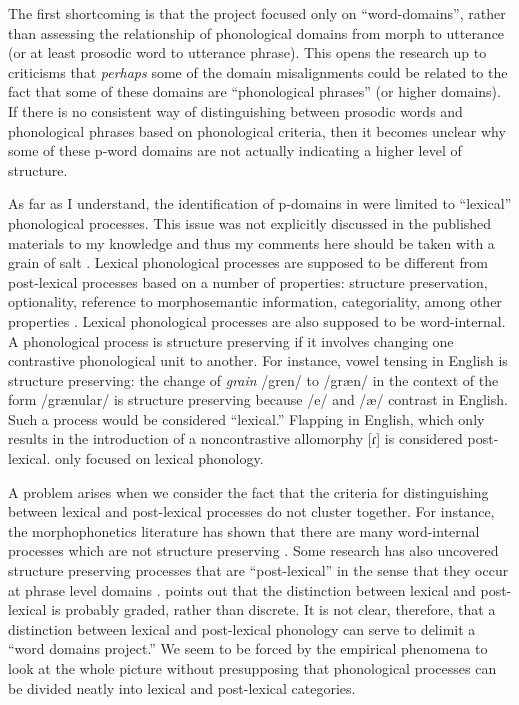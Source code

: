 \documentclass[output=paper,hidelinks]{langscibook}
\begin{document}
The first shortcoming is that the project focused only on ``word-domains'', rather than assessing the relationship of phonological domains from morph to utterance (or at least prosodic word to utterance phrase). This opens the research up to criticisms that \textit{perhaps} some of the domain misalignments could be related to the fact that some of these domains are ``phonological phrases'' (or higher domains). If there is no consistent way of distinguishing between prosodic words and phonological phrases based on phonological criteria, then it becomes unclear why some of these p-word domains are not actually indicating a higher level of structure.

As far as I understand, the identification of p-domains in \citet{schiering2012stress, bickel2009distribution} were limited to ``lexical'' phonological processes. This issue was not explicitly discussed in the published materials to my knowledge and thus my comments here should be taken with a grain of salt . Lexical phonological processes are supposed to be different from post-lexical processes based on a number of properties: structure preservation, optionality, reference to morphosemantic information, categoriality, among other properties \citep[201]{zsiga2020phonology/phonetics}. Lexical phonological processes are also supposed to be word-internal. A phonological process is structure preserving if it involves changing one contrastive phonological unit to another. For instance, vowel tensing in English is structure preserving: the change of \textit{grain} /gren/ to /græn/ in the context of the form /grænular/ is structure preserving because /e/ and /æ/ contrast in English. Such a process would be considered ``lexical.'' Flapping in English, which only results in the introduction of a noncontrastive allomorphy [ɾ] is considered post-lexical. \citet{schiering2010prosodic} only focused on lexical phonology.

A problem arises when we consider the fact that the criteria for distinguishing between lexical and post-lexical processes do not cluster together. For instance, the morphophonetics literature has shown that there are many word-internal processes which are not structure preserving \citep{plag2014phonological}. Some research has also uncovered structure preserving processes that are ``post-lexical'' in the sense that they occur at phrase level domains \citep{hyman1993structure}. \citet[214]{bybee2001phonology} points out that the distinction between lexical and post-lexical is probably graded, rather than discrete. It is not clear, therefore, that a distinction between lexical and post-lexical phonology can serve to delimit a ``word domains project.'' We seem to be forced by the empirical phenomena to look at the whole picture without presupposing that phonological processes can be divided neatly into lexical and post-lexical categories.
\end{document}
